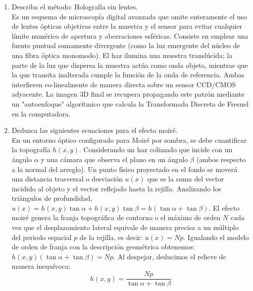 \documentclass[12pt,a4paper]{article}
\begin{document}
\begin{enumerate}
		\item Describa el método: Holografía sin lentes.\\
		Es un esquema de microscopía digital avanzada que omite enteramente el uso de lentes ópticas objetivas entre la muestra y el sensor para evitar cualquier límite numérico de apertura y aberraciones esféricas. Consiste en emplear una fuente puntual sumamente divergente (como la luz emergente del núcleo de una fibra óptica monomodo). El haz ilumina una muestra translúcida; la parte de la luz que dispersa la muestra actúa como onda objeto, mientras que la que transita inalterada cumple la función de la onda de referencia. Ambas interfieren co-linealmente de manera directa sobre un sensor CCD/CMOS adyacente. La imagen 3D final se recupera propagando este patrón mediante un "autoenfoque" algorítmico que calcula la Transformada Discreta de Fresnel en la computadora.
		
		\item Deduzca las siguientes ecuaciones para el efecto moiré.\\
		En un entorno óptico configurado para Moiré por sombra, se debe cuantificar la topografía $h(x,y)$. Considerando un haz colimado que incide con un ángulo $\alpha$ y una cámara que observa el plano en un ángulo $\beta$ (ambos respecto a la normal del arreglo). Un punto físico proyectado en el fondo se moverá una distancia trasversal o desviación $u(x)$ que es la suma del vector incidido al objeto y el vector reflejado hasta la rejilla. Analizando los triángulos de profundidad, $u(x) = h(x,y) \tan \alpha + h(x,y) \tan \beta = h(\tan\alpha + \tan\beta)$. 
		El efecto moiré genera la franja topográfica de contorno o el máximo de orden $N$ cada vez que el desplazamiento lateral equivale de manera precisa a un múltiplo del periodo espacial $p$ de la rejilla, es decir: $u(x) = N p$. 
		Igualando el modelo de orden de franja con la descripción geométrica obtenemos: $h(x,y)(\tan\alpha + \tan\beta) = N p$. Al despejar, deducimos el relieve de manera inequívoca:
		\[ h(x,y) = \frac{Np}{\tan \alpha + \tan \beta} \]
		

\end{enumerate}
\end{document}
